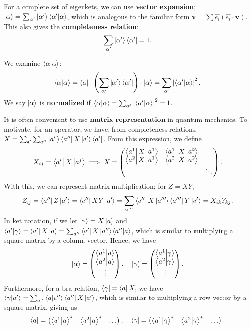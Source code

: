 \documentclass{article}
\begin{document}
For a complete set of eigenkets, we can use \textbf{vector expansion}; $\ket\alpha=\sum_{\alpha'}\ket{\alpha'}\braket{\alpha'}{\alpha}$, which is analogous to the familiar form $\mathbf v=\sum\hat{e_i}(\hat{e_i}\cdot\mathbf v)$. This also gives the \textbf{completeness relation}:
$$\sum_{\alpha'}\ket{\alpha'}\bra{\alpha'}=1.$$

We examine $\braket\alpha$: 
$$\braket\alpha=\bra\alpha\cdot\left(\sum_{\alpha'}\ket{\alpha'}\bra{\alpha'}\right)\cdot\ket\alpha=\sum_{\alpha'}\left\lvert\braket{\alpha'}{\alpha}\right\rvert^2.$$ 
We say $\ket\alpha$ is \textbf{normalized} if $\braket\alpha=\sum_{\alpha'}\left\lvert\braket{\alpha'}{\alpha}\right\rvert^2=1$.

It is often convenient to use \textbf{matrix representation} in quantum mechanics. To motivate, for an operator, we have, from completeness relations, $X=\sum_{a'}\sum_{a''}\ket{a''}\bra{a''}X\ket{a'}\bra{a'}$. From this expression, we define 
$$X_{ij}=\bra{a^i}X\ket{a^j}\implies X=\begin{pmatrix}\bra{a^1}X\ket{a^1}&\bra{a^1}X\ket{a^2}&\\\bra{a^2}X\ket{a^1}&\bra{a^2}X\ket{a^2}&\\&&\ddots\end{pmatrix}.$$
With this, we can represent matrix multiplication; for $Z=XY$, 
$$Z_{ij}=\bra{a''}Z\ket{a'}=\bra{a''}XY\ket{a'}=\sum_{a'''}\bra{a''}X\ket{a'''}\bra{a'''}Y\ket{a'}=X_{ik}Y_{kj}.$$
In ket notation, if we let $\ket{\gamma}=X\ket a$ and $\braket{a'}{\gamma}=\bra{a'}X\ket{a}=\sum_{a''}\bra{a'}X\ket{a''}\braket{a''}{a}$, which is similar to multiplying a square matrix by a column vector. Hence, we have 
$$\ket\alpha=\begin{pmatrix}\braket{a^1}{a}\\\braket{a^2}{a}\\\vdots\end{pmatrix},\quad\ket\gamma=\begin{pmatrix}\braket{a^1}{\gamma}\\\braket{a^2}{\gamma}\\\vdots\end{pmatrix}.$$
Furthermore, for a bra relation, $\bra\gamma=\bra aX,$ we have $\braket\gamma{a'}=\sum_{a''}\braket a{a''}\bra{a''}X\ket{a'}$, which is similar to multiplying a row vector by a square matrix, giving us 
$$\bra a=\begin{pmatrix}\braket{a^1}{a}^*&\braket{a^2}{a}^*&\hdots\end{pmatrix},\quad\bra\gamma=\begin{pmatrix}\braket{a^1}{\gamma}^*&\braket{a^2}{\gamma}^*&\hdots\end{pmatrix}.$$
\end{document}
